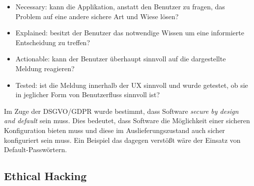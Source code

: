 \begin{itemize}
	\item Necessary: kann die Applikation, anstatt den Benutzer zu fragen, das Problem auf eine andere sichere Art und Wiese lösen?
	\item Explained: besitzt der Benutzer das notwendige Wissen um eine informierte Entscheidung zu treffen?
	\item Actionable: kann der Benutzer überhaupt sinnvoll auf die dargestellte Meldung reagieren?
	\item Tested: ist die Meldung innerhalb der UX sinnvoll und wurde getestet, ob sie in jeglicher Form von Benutzerfluss sinnvoll ist?
\end{itemize}

Im Zuge der DSGVO/GDPR wurde bestimmt, dass Software \textit{secure by design and default} sein muss. Dies bedeutet, dass Software die Möglichkeit einer sicheren Konfiguration bieten muss und diese im Auslieferungszustand auch sicher konfiguriert sein muss. Ein Beispiel das dagegen verstößt wäre der Einsatz von Default-Passwörtern.

\subsection{Ethical Hacking}

